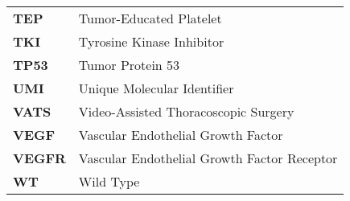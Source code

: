 \begin{longtable}[l]{l l}
    \textbf{TEP} & Tumor-Educated Platelet \\
    \textbf{TKI} & Tyrosine Kinase Inhibitor \\
    \textbf{TP53} & Tumor Protein 53 \\
    \textbf{UMI} & Unique Molecular Identifier \\
    \textbf{VATS} & Video-Assisted Thoracoscopic Surgery \\
    \textbf{VEGF} & Vascular Endothelial Growth Factor \\
    \textbf{VEGFR} & Vascular Endothelial Growth Factor Receptor \\
    \textbf{WT} & Wild Type 
\end{longtable}

\normalsize
